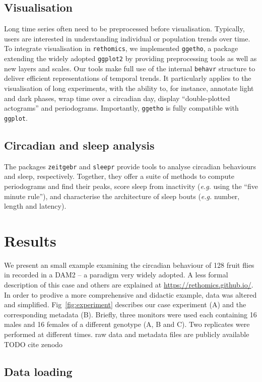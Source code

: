 \documentclass[10pt,letterpaper]{article}
\begin{document}
\subsection*{Visualisation}
Long time series often need to be preprocessed before visualisation.
Typically, users are interested in understanding individual or population trends over time.
To integrate visualisation in \texttt{rethomics},
we implemented \texttt{ggetho}, a package extending the widely adopted \texttt{ggplot2} by providing preprocessing tools as well as new layers and scales.
Our tools make full use of the internal \texttt{behavr} structure to deliver efficient representations of temporal trends.
It particularly applies to the visualisation of long experiments, with the ability to, for instance, annotate light and dark phases, wrap time over a circadian day, display ``double-plotted actograms'' and periodograms. 
Importantly, \texttt{ggetho} is fully compatible with \texttt{ggplot}.

\subsection*{Circadian and sleep analysis}
The packages \texttt{zeitgebr} and \texttt{sleepr} provide tools to analyse circadian behaviours and sleep, respectively.
Together, they offer a suite of methods to compute periodograms and find their peaks, score sleep from inactivity (\emph{e.g.} using the ``five minute rule''), and characterise the architecture of sleep bouts (\emph{e.g.} number, length and latency).


\section*{Results}
We present an small example examining the circadian behaviour of 128 fruit flies in recorded in a DAM2 -- a paradigm very widely adopted. 
A less formal description of this case and others are explained at \href{https://rethomics.github.io/}{https://rethomics.github.io/}.
In order to prodive a more comprehensive and didactic example, data was altered and simplified.	
Fig~\ref{fig:experiment} describes our case experiment (A) and the corresponding metadata (B).
Briefly, three monitors were used each containing 16 males and 16 females of a different genotype (A, B and C).
Two replicates were performed at different times.
raw data and metadata files are publicly available TODO cite zenodo

\subsection*{Data loading}
\end{document}
